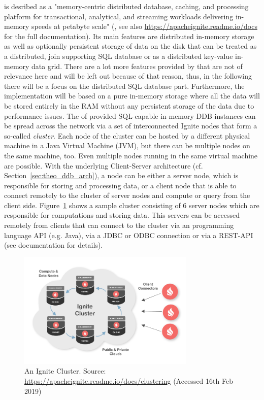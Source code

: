  is desribed as a "memory-centric distributed database, caching, and processing platform for transactional, analytical, and streaming
workloads delivering in-memory speeds at petabyte scale" (, see also \url{https://apacheignite.readme.io/docs} for the full
documentation).
Its main features are distributed in-memory storage as well as optionally persistent storage of data on the disk that can be treated as a distributed, join
supporting SQL database or as a distributed key-value in-memory data grid. There are a lot more features provided by  that are not of
relevance here and will be left out because of that reason, thus, in the following there will be a focus on the distributed SQL database part.
Furthermore, the implementation will be based on a pure in-memory storage where all the data will be stored entirely in the RAM without any persistent 
storage of the data due to performance issues. The of  provided SQL-capable in-memory DDB instances can be spread across the network 
via a set of interconnected Ignite nodes that form a so-called \emph{cluster}. Each node of the cluster can be hosted by a different physical machine 
in a Java Virtual Machine (JVM), but there can be multiple nodes on the same machine, too. Even multiple nodes running in the same virtual machine are
possible. With the underlying Client-Server architecture (cf. Section~\ref{sec:theo_ddb_arch}), a node can be either a server node, which is responsible for storing and processing data, or a
client node that is able to connect remotely to the cluster of server nodes and compute or query from the client side. Figure~\ref{fig:ign_cluster} shows
a sample cluster consisting of 6 server nodes which are responsible for computations and storing data. This servers can be accessed remotely from clients
that can connect to the cluster via an programming language API (e.g. Java), via a JDBC or ODBC connection or via a REST-API (see documentation for
details). 

\begin{figure}[h]
    \centering
    \includegraphics[width=0.75\textwidth,keepaspectratio=true]{img/9287d3c-ignite-deploy.png}
    \caption{An Ignite Cluster. Source: \protect\url{https://apacheignite.readme.io/docs/clustering} (Accessed 16th Feb 2019)}
    \label{fig:ign_cluster}
\end{figure}


